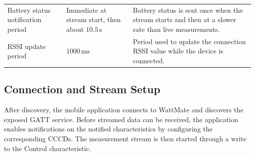 \begin{table}[H]
\begin{tabular}{p{} p{} p{}}
		Battery status notification period &
		Immediate at stream start, then about \(10.5\,\mathrm{s}\) &
		Battery status is sent once when the stream starts and then at a slower rate than live measurements. \\
		
		RSSI update period &
		\(1000\,\mathrm{ms}\) &
		Period used to update the connection RSSI value while the device is connected. \\
		\bottomrule
	\end{tabular}
\end{table}



\subsection{Connection and Stream Setup}
\label{sec:wattmate_connection_timing}

After discovery, the mobile application connects to WattMate and discovers the exposed GATT service. 
Before streamed data can be received, the application enables notifications on the notified characteristics by configuring the corresponding CCCDs. 
The measurement stream is then started through a write to the Control characteristic.

